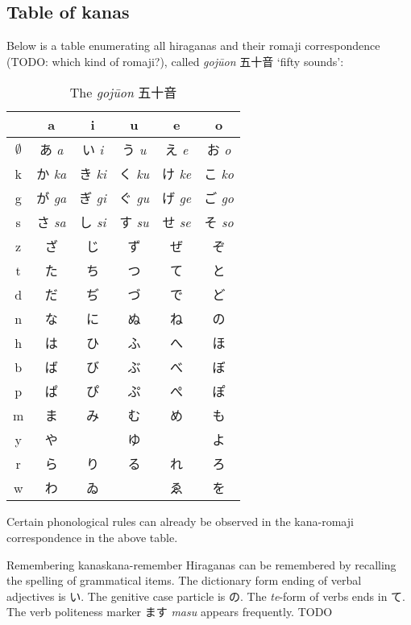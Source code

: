 \documentclass[UTF8, a4paper, oneside, scheme=plain]{ctexrep}
\newcommand{\corpus}[1]{\emph{#1}}
\newcommand{\translate}[1]{`#1'}
\begin{document}
\subsection{Table of kanas}

Below is a table enumerating all hiraganas and their romaji correspondence (TODO: which kind of romaji?), 
called \corpus{gojūon} 五十音 \translate{fifty sounds}:
\begin{table}[H]
    \caption{The \corpus{gojūon} 五十音}
    \label{tbl:hiragana-chart}
    \centering
    \begin{tabular}{cccccc}
        \toprule
         & a & i & u & e & o \\ 
        \midrule
        $\emptyset$ & あ \corpus{a} & い \corpus{i} & う \corpus{u} & え \corpus{e} & お \corpus{o} \\ 
        k & か \corpus{ka} & き \corpus{ki} & く \corpus{ku} & け \corpus{ke} & こ \corpus{ko} \\ 
        g & が \corpus{ga} & ぎ \corpus{gi} & ぐ \corpus{gu} & げ \corpus{ge} & ご \corpus{go} \\ 
        s & さ \corpus{sa} & し \corpus{si} & す \corpus{su} & せ \corpus{se} & そ \corpus{so} \\ 
        z & ざ & じ & ず & ぜ & ぞ \\ 
        t & た & ち & つ & て & と \\ 
        d & だ & ぢ & づ & で & ど \\ 
        n & な & に & ぬ & ね & の \\ 
        h & は & ひ & ふ & へ & ほ \\ 
        b & ば & び & ぶ & べ & ぼ \\ 
        p & ぱ & ぴ & ぷ & ぺ & ぽ \\ 
        m & ま & み & む & め & も \\ 
        y & や & ~ & ゆ & ~ & よ \\ 
        r & ら & り & る & れ & ろ \\ 
        w & わ & ゐ & ~ & ゑ & を \\ 
        \bottomrule
    \end{tabular}
\end{table}

Certain phonological rules can already be observed in the kana-romaji correspondence in the above table.

\begin{learnbox}{Remembering kanas}{kana-remember}
    Hiraganas can be remembered by recalling the spelling of grammatical items.
    The dictionary form ending of verbal adjectives is い.
    The genitive case particle is の.
    The \corpus{te}-form of verbs ends in て.
    The verb politeness marker ます \corpus{masu} appears frequently.
    TODO
\end{learnbox}
\end{document}
